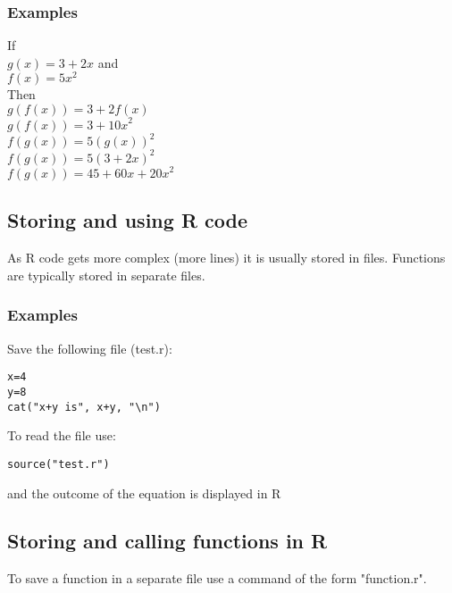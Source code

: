 \documentclass[12pt,a4paper]{article}
\theoremstyle{regla}
\theoremstyle{remark}
\theoremstyle{definition}
\theoremstyle{nonumberbreak}
\begin{document}
\subsubsection{Examples}
\begin{xmpl}
If\\
$  g(x)= {3}+ {2}x$  and \\
$f(x) = {5}{x}^2$\\
Then \\
$g(f(x)) = {3} +{2} f(x)$\\
$g(f(x)) = {3} +{10x}^2$\\
   
$f(g(x)) = {5}{(g(x))}^2$\\
$f(g(x)) = {5}{({3}+{2x})}^2$\\
$f(g(x)) = {45}+{60x}+{20x}^2$
\end{xmpl}

\subsection{Storing and using R code}
\begin{fbox}
\begin{minipage}{0.97\textwidth}
As R code gets more complex (more lines) it is usually stored in files. Functions are typically stored in separate files.
\end{minipage}
\end{fbox}
\subsubsection{Examples}
\begin{xmpl}
Save the following file (test.r):
\begin{lstlisting}
x=4
y=8
cat("x+y is", x+y, "\n")
\end{lstlisting}
To read the file use: 
\begin{lstlisting}
source("test.r")
\end{lstlisting}
and the outcome of the equation is displayed in R
\end{xmpl}

\subsection{Storing and calling functions in R}
\begin{fbox}
\begin{minipage}{0.97\textwidth}
To save a function in a separate file use a command of the form "function.r".
\end{minipage}
\end{fbox}
\end{document}
